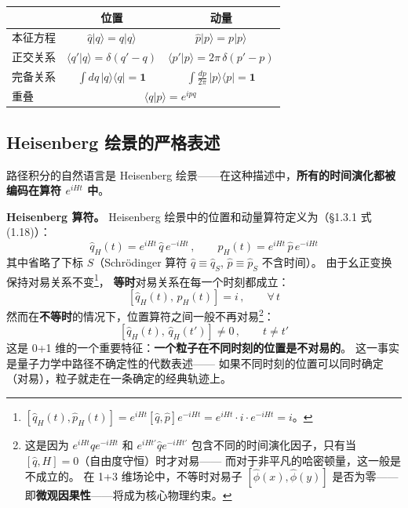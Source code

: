 \vspace{4pt}
\begin{center}
\renewcommand{\arraystretch}{1.4}
\begin{tabular}{lcc}
  \hline
  & 位置 & 动量 \\
  \hline
  本征方程 & $\hat{q}|q\rangle = q|q\rangle$ & $\hat{p}|p\rangle = p|p\rangle$ \\
  正交关系 & $\langle q'|q\rangle = \delta(q'-q)$ & $\langle p'|p\rangle = 2\pi\,\delta(p'-p)$ \\
  完备关系 & $\displaystyle\int dq\,|q\rangle\langle q| = \mathbf{1}$
           & $\displaystyle\int\frac{dp}{2\pi}\,|p\rangle\langle p| = \mathbf{1}$ \\
  重叠 & \multicolumn{2}{c}{$\langle q|p\rangle = e^{ipq}$} \\
  \hline
\end{tabular}
\end{center}

\subsection*{Heisenberg 绘景的严格表述}路径积分的自然语言是 Heisenberg 绘景——在这种描述中，\textbf{所有的时间演化都被编码在算符 $e^{iHt}$ 中}。

\vspace{6pt}
\noindent\textbf{Heisenberg 算符。}
Heisenberg 绘景中的位置和动量算符定义为（\S1.3.1 式 (1.18)）：
\begin{equation}\label{eq:Heis-ops}
  \hat{q}_H(t) = e^{iHt}\,\hat{q}\,e^{-iHt}\,,\qquad
  \hat{p}_H(t) = e^{iHt}\,\hat{p}\,e^{-iHt}
\end{equation}
其中省略了下标 $S$（Schr\"odinger 算符 $\hat{q} \equiv \hat{q}_S$, $\hat{p} \equiv \hat{p}_S$ 不含时间）。
由于幺正变换保持对易关系不变\footnote{
$[\hat{q}_H(t),\hat{p}_H(t)]
= e^{iHt}[\hat{q},\hat{p}]e^{-iHt}
= e^{iHt}\cdot i \cdot e^{-iHt} = i$。}，
\textbf{等时}对易关系在每一个时刻都成立：
\begin{equation}\label{eq:equal-time-CR}
  [\hat{q}_H(t),\,\hat{p}_H(t)] = i\,,\qquad\forall\,t
\end{equation}
然而在\textbf{不等时}的情况下，位置算符之间一般不再对易\footnote{
这是因为 $e^{iHt}\hat{q}e^{-iHt}$ 和 $e^{iHt'}\hat{q}e^{-iHt'}$
包含不同的时间演化因子，只有当 $[\hat{q}, H] = 0$（自由度守恒）时才对易——
而对于非平凡的哈密顿量，这一般是不成立的。
在 1+3 维场论中，不等时对易子 $[\hat{\phi}(x),\hat{\phi}(y)]$
是否为零——即\textbf{微观因果性}——将成为核心物理约束。
}：
\begin{equation}\label{eq:unequal-time}
  [\hat{q}_H(t),\,\hat{q}_H(t')] \neq 0\,,\qquad t \neq t'
\end{equation}
这是 0+1 维的一个重要特征：\textbf{一个粒子在不同时刻的位置是不对易的}。
这一事实是量子力学中路径不确定性的代数表述——
如果不同时刻的位置可以同时确定（对易），粒子就走在一条确定的经典轨迹上。

